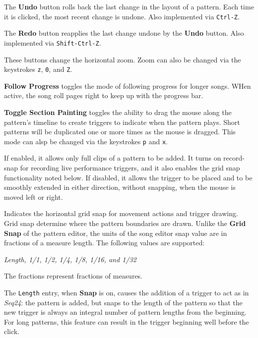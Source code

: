    The \textbf{Undo} button rolls back the last change in the layout of a
   pattern.  Each time it is clicked, the most recent change is undone.
   Also implemented via \texttt{Ctrl-Z}.

   The \textbf{Redo} button reapplies the last change undone by
   the \textbf{Undo} button.
   Also implemented via \texttt{Shift-Ctrl-Z}.

   These buttons change the horizontal zoom.
   Zoom can also be changed via the keystrokes \texttt{z}, \texttt{0},
   and \texttt{Z}.

   \textbf{Follow Progress} toggles the mode of following progress
   for longer songs.  WHen active, the song roll pages right to keep up with
   the progress bar.

   \textbf{Toggle Section Painting} toggles the ability
   to drag the mouse along the pattern's timeline to create triggers
   to indicate when the pattern plays.
   Short patterns will be duplicated one or more times as
   the mouse is dragged.
   This mode can alsp be changed via the keystrokes \texttt{p} and
   \texttt{x}.

   If enabled, it allows only full clips of a pattern to be added.
   It turns on record-snap for recording live performance triggers,
   and it also enables the grid snap functionality noted below.
   If disabled, it allows the trigger to be placed and to be smoothly extended
   in either direction, without snapping, when the mouse is moved left or
   right.

   Indicates the horizontal grid snap for movement actions and trigger drawing.
   Grid snap determine where the pattern boundaries are drawn.
   Unlike the \textbf{Grid Snap} of the pattern editor, the units
   of the song editor snap value are in fractions of a measure length.
   The following values are supported:

   \textsl{Length, 1/1, 1/2, 1/4, 1/8, 1/16, and 1/32}

   The fractions represent fractions of measures.

   The \texttt{Length} entry, when \textbf{Snap} is on, causes the addition of
   a trigger to act as in \textsl{Seq24}:  the pattern is added, but snaps to
   the length of the pattern so that the new trigger is always an integral
   number of pattern lengths from the beginning.  For long patterns, this
   feature can result in the trigger beginning well before the click.

